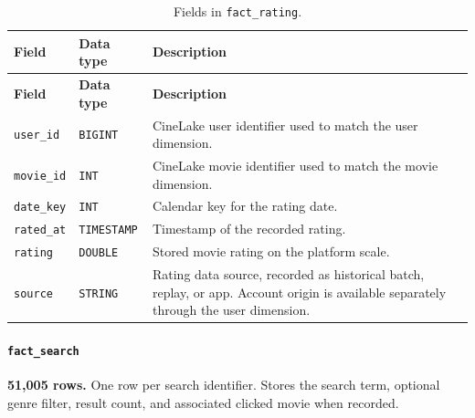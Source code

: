 \documentclass[a4paper,12pt]{article}
\newcommand{\dbsep}{\_\allowbreak}
\begin{document}
\begingroup
\small
\setlength{\tabcolsep}{4pt}
\renewcommand{\arraystretch}{1.1}
\begin{longtable}{@{}>{\raggedright\arraybackslash}p{}
                    >{\raggedright\arraybackslash}p{}
                    >{\raggedright\arraybackslash}p{}@{}}
\caption{Fields in \texttt{fact\dbsep rating}.}\\
\toprule
\textbf{Field} & \textbf{Data type} & \textbf{Description}\\
\midrule
\endfirsthead
\toprule
\textbf{Field} & \textbf{Data type} & \textbf{Description}\\
\midrule
\endhead
\bottomrule
\endfoot
\texttt{user\dbsep id} & \texttt{BIGINT} & CineLake user identifier used to match the user dimension.\\
\texttt{movie\dbsep id} & \texttt{INT} & CineLake movie identifier used to match the movie dimension.\\
\texttt{date\dbsep key} & \texttt{INT} & Calendar key for the rating date.\\
\texttt{rated\dbsep at} & \texttt{TIMESTAMP} & Timestamp of the recorded rating.\\
\texttt{rating} & \texttt{DOUBLE} & Stored movie rating on the platform scale.\\
\texttt{source} & \texttt{STRING} & Rating data source, recorded as historical batch, replay, or app. Account origin is available separately through the user dimension.\\
\end{longtable}
\endgroup

\paragraph{\texttt{fact\dbsep search}}
\textbf{51,005 rows.} One row per search identifier.
Stores the search term, optional genre filter, result count, and associated clicked movie when recorded.
\end{document}
